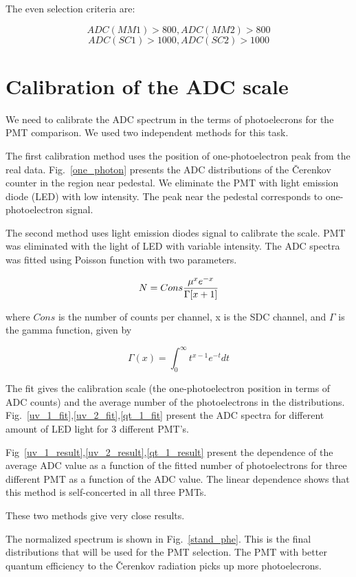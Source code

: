 \documentclass[11pt,titlepage]{article}
\begin{document}
The even selection criteria are:

  {$$ADC(MM1)> 800, ADC(MM2)> 800$$}
  {$$ADC(SC1)> 1000, ADC(SC2)> 1000$$} 


\section{Calibration of the ADC scale}

We need to calibrate the ADC spectrum  in the terms of photoelecrons for the PMT comparison.
We used two independent methods for this task.

The first calibration method uses the position of one-photoelectron peak from the real data.
Fig.~\ref{one_photon} presents the ADC distributions of the \v Cerenkov counter in the
region near pedestal. We eliminate the PMT with light emission diode (LED) with low intensity.
The peak near the pedestal corresponds to one-photoelectron signal.

The second method uses light emission diodes signal  to calibrate the scale.
PMT was eliminated with the light of LED with variable intensity.
The ADC spectra was fitted using Poisson function with two parameters.

$$ N=Cons{\mu^xe^{-x}\over\Gamma[x+1]}$$

where $Cons$ is the number of counts per channel, x is the SDC channel, 
and $\Gamma$ is the gamma function, given by

$$\Gamma(x)=\int^\infty_0t^{x-1}e^{-t}dt$$
 
The fit gives the calibration scale (the one-photoelectron position in terms of ADC counts) and
the average number of the photoelectrons in the distributions.
Fig.~\ref{uv_1_fit},\ref{uv_2_fit},\ref{qt_1_fit} present the ADC spectra for different amount of LED light
for 3 different PMT's. 

Fig~\ref{uv_1_result},\ref{uv_2_result},\ref{qt_1_result}  present the dependence of the average ADC value
as a function of the fitted number of photoelectrons for three different PMT
as a function of the ADC value.
The linear dependence shows that this method is self-concerted in all three PMTs.

These two methods give very close results.

The normalized spectrum is shown in Fig.~\ref{stand_phe}.
This is the final distributions that will be used for the PMT selection.
The PMT with better quantum efficiency to the \v Cerenkov radiation
picks up more photoelecrons.
\end{document}
